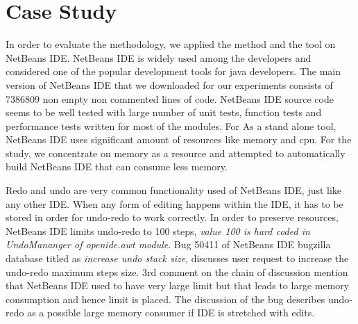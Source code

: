 \section{Case Study}

In order to evaluate the methodology, we applied the method and the tool on NetBeans IDE. NetBeans IDE is widely used among the developers and considered one of the popular development tools for java developers.  The main version of NetBeans IDE that we downloaded for our experiments consists of 7386809 non empty non commented lines of code. NetBeans IDE source code seems to be well tested with large number of unit tests, function tests and performance tests written for most of the modules. For As a stand alone tool, NetBeans IDE uses significant amount of resources like memory and cpu. For the study, we concentrate on memory as a resource and attempted to automatically build NetBeans IDE that can consume less memory.



Redo and undo are very common functionality used of NetBeans IDE, just like any other IDE. When any form of editing happens within the IDE, it has to be stored in order for undo-redo to work correctly. In order to preserve resources, NetBeans IDE limits undo-redo to 100 steps, \emph{value 100 is hard coded in UndoMananger of openide.awt module}. Bug 50411 of NetBeans IDE bugzilla database titled as \emph{increase undo stack size}, discusses user request to increase the undo-redo maximum steps size. 3rd comment on the chain of discussion mention that NetBeans IDE used to have very large limit but that leads to large memory consumption and hence limit is placed. The discussion of the bug describes undo-redo as a possible large memory consumer if IDE is stretched with edits. 

